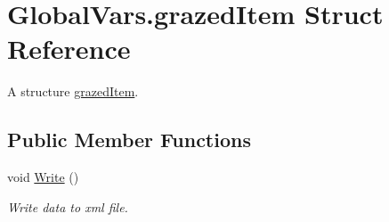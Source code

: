 \hypertarget{struct_global_vars_1_1grazed_item}{}\section{Global\+Vars.\+grazed\+Item Struct Reference}
\label{struct_global_vars_1_1grazed_item}


A structure \mbox{\hyperlink{struct_global_vars_1_1grazed_item}{grazed\+Item}}.  


\subsection*{Public Member Functions}
\begin{DoxyCompactItemize}
\item 
void \mbox{\hyperlink{struct_global_vars_1_1grazed_item_a5097dcb4a0b6ed484dd0567e058ae9a0}{Write}} ()
\begin{DoxyCompactList}\small\item\em Write data to xml file. \end{DoxyCompactList}\end{DoxyCompactItemize}
